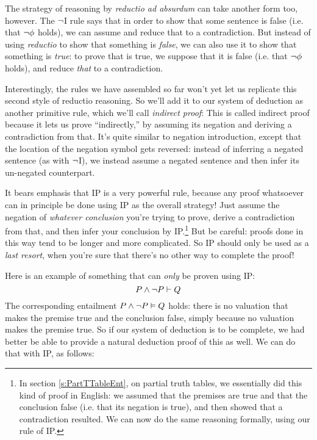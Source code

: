 The strategy of reasoning by \emph{reductio ad absurdum} can take another form too, however. The $\neg$I rule says that in order to show that some sentence \meta{\phi} is false (i.e. that $\neg \mathcal{\phi}$ holds), we can assume \meta{\phi} and reduce that to a contradiction.  But instead of using \emph{reductio} to show that something is \emph{false}, we can also use it to show that something is \emph{true}: to prove that \meta{\phi} is true, we suppose that it is false (i.e. that $\neg \mathcal{\phi}$ holds), and reduce \emph{that} to a contradiction.



Interestingly, the rules we have assembled so far won't yet let us replicate this second style of reductio reasoning.  So we'll add it to our system of deduction as another primitive rule, which we'll call \emph{indirect proof}:
This is called indirect proof because it lets us prove \meta{\phi} ``indirectly,'' by assuming its negation and deriving a contradiction from that. It's quite similar to negation introduction, except that the location of the negation symbol gets reversed: instead of inferring a negated sentence (as with $\neg$I), we instead assume a negated sentence and then infer its un-negated counterpart.

It bears emphasis that IP is a very powerful rule, because any proof whatsoever can in principle be done using IP as the overall strategy!  Just assume the negation of \emph{whatever conclusion} you're trying to prove, derive a contradiction from that, and then infer your conclusion by IP.\footnote{In section \ref{s:PartTTableEnt}, on partial truth tables, we essentially did this kind of proof in English: we assumed that the premises are true and  that the conclusion false (i.e. that its negation  is true), and then showed that a contradiction resulted.  We can now do the same reasoning formally, using our rule of IP.}  But be careful: proofs done in this way tend to be longer and more complicated.  So IP should only be used as a \emph{last resort}, when you're sure that there's no other way to complete the proof!

Here is an example of something that can \emph{only} be proven using IP:
$$P \wedge \neg P \vdash Q$$
The corresponding entailment $P \wedge \neg P \vDash Q$ holds: there is no valuation that makes the premise true and the conclusion false, simply because no valuation makes the premise true.  So if our system of deduction is to be complete, we had better be able to provide a natural deduction proof of this as well.  We can do that with IP, as follows:\\

